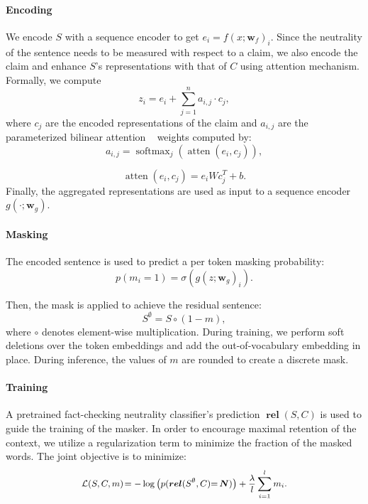 \documentclass[letterpaper]{article}
\DeclareMathOperator{\rel}{\boldsymbol{rel}}
\DeclareMathOperator{\atten}{atten}
\DeclareMathOperator{\softmax}{softmax}
\DeclareMathOperator{\N}{\boldsymbol{N}}
\begin{document}
\paragraph{Encoding}
We encode $S$ with a sequence encoder to get $e_i = f(x; \boldsymbol{w}_f)_i$.
Since the neutrality of the sentence needs to be measured with respect to a claim, we also encode the claim and enhance $S$'s representations with that of $C$ using attention mechanism. Formally, we compute
\begin{equation}
	z_i = e_i + \sum_{j=1}^n a_{i,j}\cdot c_j ,
\end{equation}
where $c_j$ are the encoded representations of the claim and $a_{i,j}$ are the parameterized bilinear attention ~\cite{kim2018bilinear} weights computed by:
\begin{equation}
	a_{i,j} = \softmax_j(\atten(e_i, c_j)),
\end{equation}

\begin{equation}
	\atten(e_i, c_j) = e_i W c_j^T + b.
\end{equation}
Finally, the aggregated representations are used as input to a sequence encoder $g(\cdot; \boldsymbol{w}_g)$.


\paragraph{Masking}

The encoded sentence is used to predict a per token masking probability:
\begin{equation}
	p(m_i = 1) = \sigma(g(z; \boldsymbol{w}_g)_i).
\label{eq:mask_prob}
\end{equation}

Then, the mask is applied to achieve the residual sentence:
\begin{equation}
    S^{\emptyset} = S \circ (1-m),
\end{equation}
where $\circ$ denotes element-wise multiplication. During training, we perform soft deletions over the token embeddings and add the out-of-vocabulary embedding in place. During inference, the values of $m$ are rounded to create a discrete mask.



\paragraph{Training}
A pretrained fact-checking neutrality classifier's prediction $\rel(S,C)$ is used to guide the training of the masker. In order to encourage maximal retention of the context, we utilize a regularization term to minimize the fraction of the masked words. The joint objective is to minimize:
\begin{equation}
    \small{
    \mathcal{L}(S,C,m)\!= - \log \left(p(\rel(S^\emptyset,C){=}\N)\right) + \frac{\lambda}{l} \sum_{i=1}^{l} m_i.
    }
\label{eq:mask_gen_loss}
\end{equation}
\end{document}
